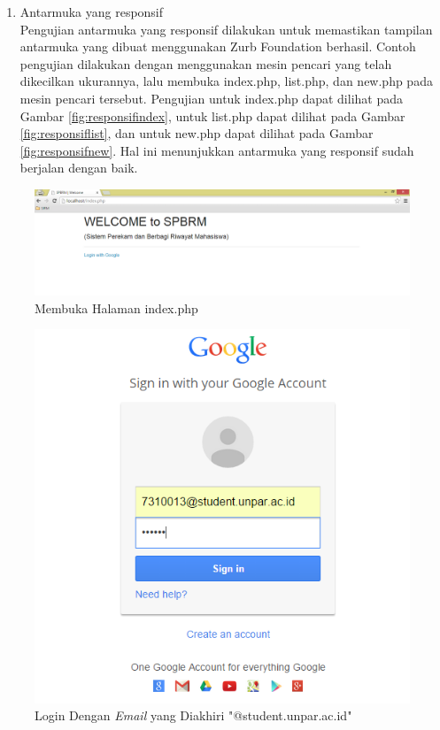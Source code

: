 \begin{enumerate}[(1)]
\item Antarmuka yang responsif\\
    Pengujian antarmuka yang responsif dilakukan untuk memastikan tampilan antarmuka yang dibuat menggunakan Zurb Foundation berhasil. Contoh pengujian dilakukan dengan menggunakan mesin pencari yang telah dikecilkan ukurannya, lalu membuka index.php, list.php, dan new.php pada mesin pencari tersebut. Pengujian untuk index.php dapat dilihat pada Gambar \ref{fig:responsifindex}, untuk list.php dapat dilihat pada Gambar \ref{fig:responsiflist}, dan untuk new.php dapat dilihat pada Gambar \ref{fig:responsifnew}. Hal ini menunjukkan antarmuka yang responsif sudah berjalan dengan baik.
\end{enumerate}

\begin{figure}[H]
\centering
\includegraphics[scale=0.44]{Gambar/pengujian1.png}
\caption[Membuka Halaman index.php]{Membuka Halaman index.php} 
\label{fig:membukahalamanindex}
\end{figure}

\begin{figure}[H]
\centering
\includegraphics[scale=0.44]{Gambar/pengujian2.png}
\caption[Login Dengan {\it Email} yang Diakhiri "@student.unpar.ac.id"]{Login Dengan {\it Email} yang Diakhiri "@student.unpar.ac.id"}
\label{fig:logindenganstudent}
\end{figure}

